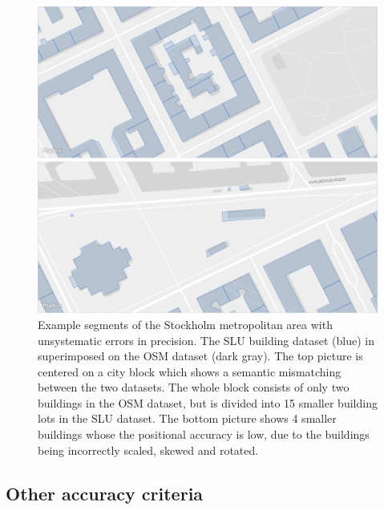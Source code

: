 \documentclass{kththesis}
\begin{document}
\begin{figure}[H]
    \centering
    \includegraphics[width=\textwidth,height=0.5\textheight,keepaspectratio]{img_map_compare}
    \caption{Example segments of the Stockholm metropolitan area with unsystematic errors in precision. The SLU building dataset (blue) in superimposed on the OSM dataset (dark gray). The top picture is centered on a city block which shows a semantic mismatching between the two datasets. The whole block consists of only two buildings in the OSM dataset, but is divided into 15 smaller building lots in the SLU dataset. The bottom picture shows 4 smaller buildings whose the positional accuracy is low, due to the buildings being incorrectly scaled, skewed and rotated.}
    \label{fig:osm-slu-map}
\end{figure}

\subsection{Other accuracy criteria}
\end{document}

